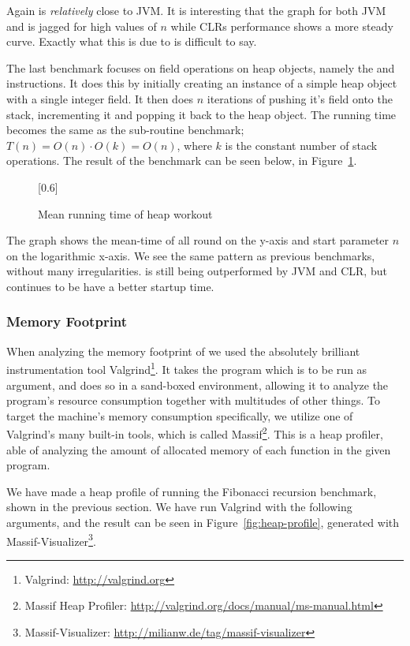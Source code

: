 Again \thename{} is \emph{relatively} close to JVM. It is interesting that the
graph for both JVM and \thename{} is jagged for high values of $n$ while CLRs
performance shows a more steady curve. Exactly what this is due to is difficult
to say.


The last benchmark focuses on field operations on heap objects, namely the
 and  instructions. It does
this by initially creating an instance of a simple heap object with a single
integer field. It then does $n$ iterations of pushing it's field onto the stack,
incrementing it and popping it back to the heap object. The running time becomes
the same as the sub-routine benchmark; $T(n) = O(n) \cdot O(k) = O(n)$, where
$k$ is the constant number of stack operations. The result of the benchmark can
be seen below, in Figure~\ref{fig:eval:benchmark:heap}.

\begin{figure}[H]
  \centering
  \scalebox{0.8}[0.6]{}
  \caption{Mean running time of heap workout}
\label{fig:eval:benchmark:heap}
\end{figure}

The graph shows the mean-time of all round on the y-axis and start parameter $n$
on the logarithmic x-axis. We see the same pattern as previous benchmarks,
without many irregularities. \thename{} is still being outperformed by JVM and
CLR, but continues to be have a better startup time.

\subsubsection{Memory Footprint}

When analyzing the memory footprint of \thename{} we used the absolutely
brilliant instrumentation tool Valgrind\footnote{Valgrind:
  \url{http://valgrind.org}}. It takes the program which is to be run as
argument, and does so in a sand-boxed environment, allowing it to analyze the
program's resource consumption together with multitudes of other things. To
target the machine's memory consumption specifically, we utilize one of
Valgrind's many built-in tools, which is called Massif\footnote{Massif Heap
  Profiler: \url{http://valgrind.org/docs/manual/ms-manual.html}}. This is a
heap profiler, able of analyzing the amount of allocated memory of each function
in the given program.

We have made a heap profile of \thename{} running the Fibonacci recursion
benchmark, shown in the previous section. We have run Valgrind with the
following arguments, and the result can be seen in
Figure~\ref{fig:heap-profile}, generated with
Massif-Visualizer\footnote{Massif-Visualizer:
  \url{http://milianw.de/tag/massif-visualizer}}.

